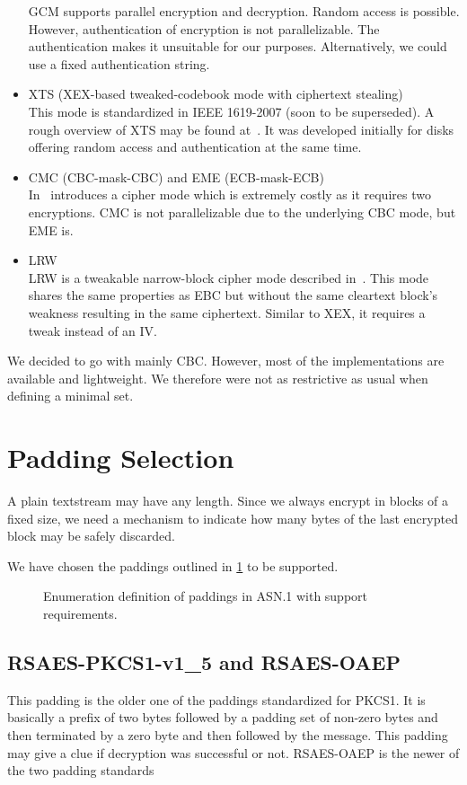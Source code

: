 \begin{itemize}
	GCM supports parallel encryption and decryption. Random access is possible. However, authentication of encryption is not parallelizable. The authentication makes it unsuitable for our purposes. Alternatively, we could use a fixed authentication string.
	\item XTS (XEX-based tweaked-codebook mode with ciphertext stealing)\\
	This mode is standardized in IEEE 1619-2007 (soon to be superseded). A rough overview of XTS may be found at~\cite{Martin2010}. It was developed initially for disks offering random access and authentication at the same time. 
	\item CMC (CBC-mask-CBC) and EME (ECB-mask-ECB)\\ 
	In~\cite{Halevi:2003} \citeauthor{Halevi:2003} introduces a cipher mode which is extremely costly as it requires two encryptions. CMC is not parallelizable due to the underlying CBC mode, but EME is. 
	\item LRW\\
	LRW is a tweakable narrow-block cipher mode described in~\cite{tschorsch:translayeranon}. This mode shares the same properties as EBC but without the same cleartext block's weakness resulting in the same ciphertext. Similar to XEX, it requires a tweak instead of an IV.
\end{itemize}

We decided to go with mainly CBC. However, most of the implementations are available and lightweight. We therefore were not as restrictive as usual when defining a minimal set.

\section{Padding Selection}
A plain textstream may have any length. Since we always encrypt in blocks of a fixed size, we need a mechanism to indicate how many bytes of the last encrypted block may be safely discarded. 

We have chosen the paddings outlined in \cref{fig:defPaddings} to be supported.
\begin{figure}[ht]
	
	\caption{Enumeration definition of paddings in ASN.1 with support requirements.}
	\label{fig:defPaddings}
\end{figure}

\subsection{RSAES-PKCS1-v1\_5 and RSAES-OAEP}
This padding is the older one of the paddings standardized for PKCS1. It is basically a prefix of two bytes followed by a padding set of non-zero bytes and then terminated by a zero byte and then followed by the message. This padding may give a clue if decryption was successful or not. RSAES-OAEP is the newer of the two padding standards 

